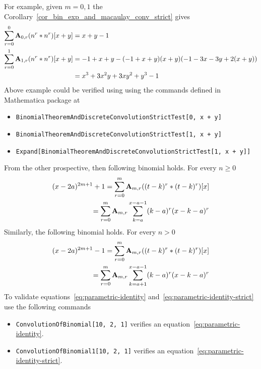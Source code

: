 For example, given $m=0,1$ the Corollary~\ref{cor_bin_exp_and_macaulay_conv_strict} gives
\begin{equation*}
    \begin{split}
        \sum_{r=0}^{0} {\mathbf{A}} \sb{0,r} (n \sp{r} \ast n \sp{r}) [x+y]
        &= x + y - 1 \\
        \sum_{r=0}^{1} {\mathbf{A}} \sb{1,r} (n \sp{r} \ast n \sp{r}) [x+y]
        &= -1 + x + y - (-1 + x + y) (x + y) (-1 - 3 x - 3 y + 2 (x + y)) \\
        &= x^3 + 3 x^2 y + 3 x y^2 + y^3 - 1
    \end{split}
\end{equation*}
Above example could be verified using using the commands defined in Mathematica package at~\cite{github_source_files}
\begin{itemize}
    \item \texttt{BinomialTheoremAndDiscreteConvolutionStrictTest[0, x + y]}
    \item \texttt{BinomialTheoremAndDiscreteConvolutionStrictTest[1, x + y]}
    \item \texttt{Expand[BinomialTheoremAndDiscreteConvolutionStrictTest[1, x + y]]}
\end{itemize}
From the other prospective, then following binomial holds.
For every $n \geq 0$
\begin{equation}
    \label{eq:parametric-identity}
    \begin{split}
        (x-2a)^{2m+1} + 1 = \sum_{r=0}^{m} {\mathbf{A}} \sb{m,r} ((t-k)^r \ast (t-k)^r)[x] \\
                          = \sum_{r=0}^{m} {\mathbf{A}} \sb{m,r} \sum_{k=a}^{x-a-1} (k-a)^r (x-k-a)^r
    \end{split}
\end{equation}
Similarly, the following binomial holds.
For every $n > 0$
\begin{equation}
    \label{eq:parametric-identity-strict}
    \begin{split}
        (x-2a)^{2m+1} - 1 = \sum_{r=0}^{m} {\mathbf{A}} \sb{m,r} ((t-k)^r \ast (t-k)^r)[x] \\
                          = \sum_{r=0}^{m} {\mathbf{A}} \sb{m,r} \sum_{k=a+1}^{x-a-1} (k-a)^r (x-k-a)^r
    \end{split}
\end{equation}
To validate equations~\eqref{eq:parametric-identity} and~\eqref{eq:parametric-identity-strict}
use the following commands
\begin{itemize}
    \item \texttt{ConvolutionOfBinomial[10, 2, 1]} verifies an equation~\eqref{eq:parametric-identity}.
    \item \texttt{ConvolutionOfBinomial1[10, 2, 1]} verifies an equation~\eqref{eq:parametric-identity-strict}.
\end{itemize}

